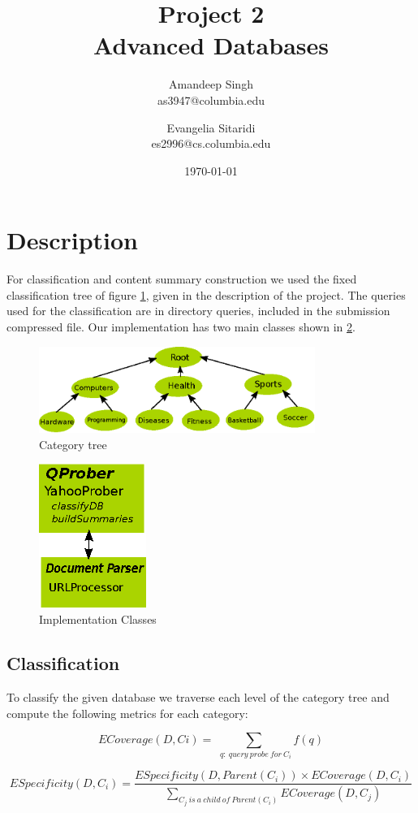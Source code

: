 \documentclass[11pt]{article}
\title{Project 2 \\ Advanced Databases \\}
\author{
Amandeep  Singh\\as3947@columbia.edu
\and
Evangelia  Sitaridi \\ es2996@cs.columbia.edu
}
\date{\today}
\begin{document}
\maketitle

\section{Description}
For classification and content summary construction we used the fixed classification tree of figure \ref{fig:tree}, given in the description of the project. The queries
used for the classification are in directory queries, included in the submission compressed file. Our implementation has two main classes shown in \ref{fig:classes}.

\begin{figure}[htb!]
\centering
\includegraphics[width=90mm]{cattree}
\caption{Category tree}
\label{fig:tree}
\end{figure}


\begin{figure}[htb!]
\centering
\includegraphics[width=35mm]{classes}
\caption{Implementation Classes}
\label{fig:classes}
\end{figure}

\subsection{Classification}
To classify the given database we traverse each level of the category tree and compute the following metrics for each category:

\[ECoverage(D,Ci)=\sum_{\ \ q: \ query \ probe \ for \ C_i}{f(q)} \]

\[ESpecificity(D, C_i ) = \frac{ESpecificity(D, Parent(C_i )) \times ECoverage(D, C_i )} {\sum_{C_j \  is \ a \ child \ of \ Parent(C_i)} {ECoverage(D,C_j)}} \]
\end{document}
